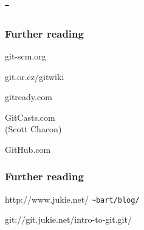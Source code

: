 \documentclass[english]{beamer}
\newcommand{\mysubsection}[2]{%
  \hypertarget{#2}{}%
  \subsection{#1}%
  \label{#2}%
}
\newcommand{\faint}[1]{%
\textcolor{code-gray}{#1}%
}
\newcommand{\green}[1]{%
\textcolor{code-green}{#1}%
}
\newcommand{\blue}[1]{%
\textcolor{code-blue}{#1}%
}
\begin{document}
\mysubsection{-}{using:end}
\begin{frame}
\frametitle{Further reading}
\begin{center}
        \blue{git-scm.org}

        \pause{}
        \blue{git.or.cz/gitwiki}
        \vspace{\baselineskip}

        \pause{}
        \blue{gitready.com}
        \vspace{\baselineskip}

        \pause{}
        \blue{GitCasts.com} \\
        \faint{(Scott Chacon)}
        \vspace{\baselineskip}

        \pause{}
        \blue{GitHub.com} \\
\end{center}
\end{frame}

\begin{frame}[fragile]
\frametitle{Further reading}
\begin{center}
        \blue{http://www.jukie.net/}\Verb!~bart/blog/!
        \vspace{\baselineskip}

        \pause{}
        \green{git://git.jukie.net/intro-to-git.git/}
\end{center}
\end{frame}

\end{document}
